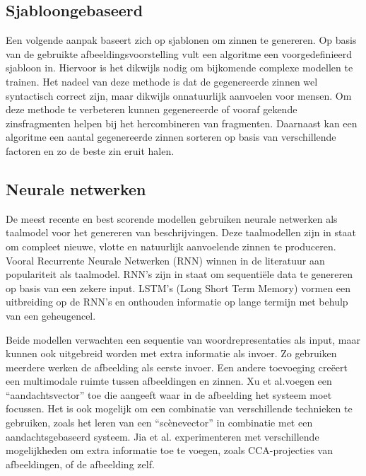 \subsection{Sjabloongebaseerd}
Een volgende aanpak baseert zich op sjablonen om zinnen te genereren. Op basis van de gebruikte afbeeldingsvoorstelling vult een algoritme een voorgedefinieerd sjabloon in\cite{Yang2011}. Hiervoor is het dikwijls nodig om bijkomende complexe modellen te trainen\cite{Elliott2013}. Het nadeel van deze methode is dat de gegenereerde zinnen wel syntactisch correct zijn, maar dikwijls onnatuurlijk aanvoelen voor mensen. Om deze methode te verbeteren kunnen gegenereerde of vooraf gekende zinsfragmenten helpen bij het hercombineren van fragmenten\cite{Mitchell2012,Kuznetsova2012}. Daarnaast kan een algoritme een aantal gegenereerde zinnen sorteren op basis van verschillende factoren en zo de beste zin eruit halen. 

\subsection{Neurale netwerken}
De meest recente en best scorende modellen gebruiken neurale netwerken als taalmodel voor het genereren van beschrijvingen. Deze taalmodellen zijn in staat om compleet nieuwe, vlotte en natuurlijk aanvoelende zinnen te produceren. Vooral Recurrente Neurale Netwerken (RNN)\cite{Mikolov2010} winnen in de literatuur aan populariteit als taalmodel. RNN's zijn in staat om sequenti\"ele data te genereren op basis van een zekere input. LSTM's (Long Short Term Memory)\cite{SeppHochreiter1997} vormen een uitbreiding op de RNN's en onthouden informatie op lange termijn met behulp van een geheugencel.

Beide modellen verwachten een sequentie van woordrepresentaties als input, maar kunnen ook uitgebreid worden met extra informatie als invoer. Zo gebruiken meerdere werken de afbeelding als eerste invoer. Een andere toevoeging cre\"eert een multimodale ruimte tussen afbeeldingen en zinnen\cite{Kiros2014,Socher2014}. Xu et al.\cite{Xu2015}voegen een ``aandachtsvector'' toe die aangeeft waar in de afbeelding het systeem moet focussen. Het is ook mogelijk om een combinatie van verschillende technieken te gebruiken, zoals het leren van een ``sc\`enevector'' in combinatie met een aandachtsgebaseerd systeem\cite{Jin2015}. Jia et al. experimenteren met verschillende mogelijkheden om extra informatie toe te voegen, zoals CCA-projecties van afbeeldingen, of de afbeelding zelf\cite{Fernando2015}.

